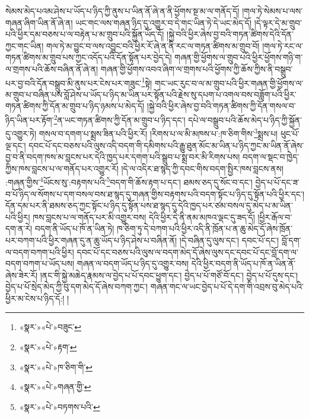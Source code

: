 སེམས་མེད་པའམ་ཤེས་པ་ཡོད་པ་ཉིད་ཀྱི་ནུས་པ་ཡིན་ནོ་ཞེ་ན་ནི་ཕྱོགས་སྔ་མ་ལ་གནོད་དོ། །གལ་ཏེ་སེམས་པ་ལས་གཞན་ཞིག་ཡིན་ནོ་ཞེ་ན། ཡང་གང་ལས་གཞན་ཉིད་དུ་འགྱུར་བ་དེ་གང་ཡིན་ཏེ་དེ་ཡང་མེད་དོ། །དེ་ལྟར་དེ་མ་གྲུབ་པའི་ཕྱིར་དམ་བཅས་པ་ལ་བརྟེན་པ་མ་གྲུབ་པའི་སྐྱོན་ཡོད་དོ། །སྐྱེ་བའི་ཕྱིར་ཞེས་བྱ་བའི་གཏན་ཚིགས་དེའི་དོན་ཀྱང་གང་ཡིན། གལ་ཏེ་མ་བྱུང་བ་ལས་འབྱུང་བའི་ཕྱིར་རོ་ཞེ་ན་ནི་རང་ལ་གཏན་ཚིགས་མ་གྲུབ་བོ། །གལ་ཏེ་རང་ལ་གཏན་ཚིགས་མ་གྲུབ་པས་ཀྱང་འདོད་པའི་དོན་སྟོན་པར་བྱེད་དེ། གཞན་གྱི་ཕྱོགས་ལ་གྲུབ་པའི་ཕྱིར་ཕྱོགས་གཉི་ག་ལ་གྲགས་པའི་ཆོས་བཞིན་ནོ་ཞེ་ན། གཞན་གྱི་ཕྱོགས་འབའ་ཞིག་ལ་གྲགས་པའི་ཕྱོགས་ཀྱི་ཆོས་ཀྱིས་ནི་བསྒྲུབ་པར་བྱ་བའི་དོན་བསྒྲུབ་མི་ནུས་པར་ངེས་པར་གཟུང་\footnote{«སྣར་»«པེ་»བཟུང་}སྟེ། གང་ཡང་རུང་བ་ལ་མ་གྲུབ་པའི་ཕྱིར་གཞན་གྱི་ཕྱོགས་ལ་མ་གྲུབ་པ་བཞིན་པས་བློ་ཤེས་པ་ཡོད་པ་ཉིད་མ་ཡིན་པར་སྟོན་པའི་རྗེས་སུ་དཔག་པ་འགལ་བས་བཟློག་པའི་ཕྱིར་གཏན་ཚིགས་ཀྱི་དོན་མ་གྲུབ་པ་ཉིད་ཉམས་པ་མེད་དོ། །སྐྱེ་བའི་ཕྱིར་ཞེས་བྱ་བའི་གཏན་ཚིགས་ཀྱི་དོན་གསལ་བ་ཉིད་ཡིན་པར་རྟོག་\footnote{«སྣར་»«པེ་»རྟག་}ན་ཡང་གཏན་ཚིགས་ཀྱི་དོན་མ་གྲུབ་པ་ཉིད་དང་། དཔེ་ལ་བསྒྲུབ་པའི་ཆོས་མེད་པ་ཉིད་ཀྱི་སྐྱོན་དུ་འགྱུར་ཏེ། གསལ་བ་དགག་པ་སྨྲས་ཟིན་པའི་ཕྱིར་རོ། །རིགས་པ་ལ་མི་མཁས་པ་:ཁ་ཅིག་གིས་\footnote{«སྣར་»«པེ་»ཁ་ཅིག་གི་}སྨྲས་པ། ཕུང་པོ་ལྔ་དང་། དབང་པོ་དང་བཅས་པའི་ལུས་འདི་བདག་གི་དམིགས་པའི་རྒྱུ་ཐུན་མོང་མ་ཡིན་པ་ཉིད་ཀྱང་མ་ཡིན་ནོ་ཞེས་བྱ་བ་ནི་བདག་ཁས་མ་བླངས་པར་དེའི་ཁྱད་པར་དགག་པའི་སྒྲུབ་པ་སྨྲ་བར་མི་རིགས་པས། བདག་ལ་སྡང་བ་ཁྱེད་ཀྱིས་ཁས་བླངས་པ་ལ་གནོད་པར་འགྱུར་རོ། །དེ་ལ་འདིར་ཐ་སྙད་ཀྱི་དབང་གིས་བདག་སྤྱིར་ཁས་བླངས་ནས། :གཞན་གྱིས་\footnote{«སྣར་»«པེ་»གཞན་གྱི་}ཡོངས་སུ་:བརྟགས་པའི་\footnote{«སྣར་»«པེ་»བཏགས་པའི་}བདག་གི་ཆོས་རྟག་པ་དང་། ཐམས་ཅད་དུ་སོང་བ་དང་། བྱེད་པ་པོ་དང་ཟ་བ་པོ་ཉིད་ལ་སོགས་པ་དག་བསལ་བས་ཐ་སྙད་དུ་གཞན་གྱིས་བརྟགས་པའི་བདག་སྟོང་པ་ཉིད་དུ་སྟོན་པའི་ཕྱིར་དང་། དོན་དམ་པར་ནི་ཐམས་ཅད་ཀྱང་སྟོང་པ་ཉིད་དུ་སྟོན་པས་ཐ་སྙད་དུ་དེའི་ཁྱད་པར་ཙམ་བསལ་དུ་མེད་པ་མ་ཡིན་པའི་ཕྱིར། ཁས་བླངས་པ་ལ་གནོད་པར་མི་འགྱུར་བས། དེའི་ཕྱིར་དེ་ནི་ནམ་མཁའ་ལྡང་དུ་ཟད་དོ། །ཕྱིར་རྒོལ་བ་དག་ན་རེ། བདག་ནི་ཡོད་པ་ཁོ་ན་ཡིན་ཏེ། ཁ་ཅིག་ཏུ་དེ་བཀག་པའི་ཕྱིར་འདི་ནི་ཁྲོན་པ་ན་ཆུ་མེད་དོ་ཞེས་ཁྲོན་པར་བཀག་པའི་ཕྱིར་གཞན་དུ་ན་ཆུ་ཡོད་པ་ཉིད་ཤེས་པ་བཞིན་ནོ། །དེ་བཞིན་དུ་ལུས་དང་། དབང་པོ་དང་། བློ་དག་ལ་བདག་བཀག་པའི་ཕྱིར། དབང་པོ་དང་བཅས་པའི་ལུས་ལ་བདག་མེད་དོ་ཞེས་ལུས་དང་དབང་པོ་དང་བློ་དག་ལ་བདག་བཀག་པ་ཡོད་པས། གཞན་ལ་བདག་ཡོད་པ་ཉིད་དུ་འགྱུར་བས། དེའི་ཕྱིར་བདག་ནི་ཡོད་པ་ཁོ་ན་ཡིན་ནོ་ཞེས་ཟེར་རོ། །ནང་གི་སྐྱེ་མཆེད་རྣམས་ལ་བྱེད་པ་པོ་དབང་ཕྱུག་དང་། བྱེད་པ་པོ་གཙོ་བོ་དང་། བྱེད་པ་པོ་དུས་དང་། བྱེད་པ་པོ་སྲེད་མེད་ཀྱི་བུ་དག་མེད་དོ་ཞེས་བཀག་ཀྱང་། གཞན་གང་ལ་ཡང་བྱེད་པ་པོ་དེ་དག་གི་འབྲས་བུ་མེད་པའི་ཕྱིར་མ་ངེས་པ་ཉིད་དོ:། །
